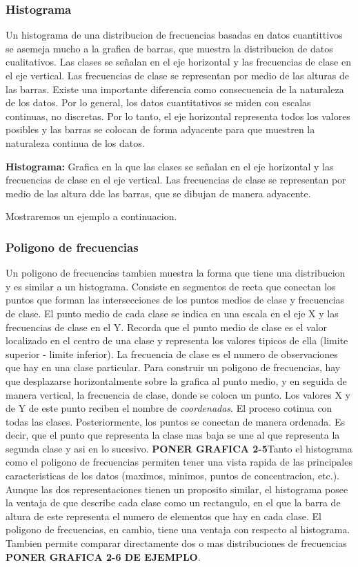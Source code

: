 \documentclass[]{article}
\begin{document}
\subsubsection*{Histograma}
Un histograma de una distribucion de frecuencias basadas en datos cuantittivos se asemeja mucho a la grafica de barras, que muestra la distribucion de datos cualitativos. Las clases se señalan en el eje horizontal y las frecuencias de clase en el eje vertical. Las frecuencias de clase se representan por medio de las alturas de las barras. Existe una importante diferencia como consecuencia de la naturaleza de los datos. Por lo general, los datos cuantitativos se miden con escalas continuas, no discretas. Por lo tanto, el eje horizontal representa todos los valores posibles y las barras se colocan de forma adyacente para que muestren la naturaleza continua de los datos.
\begin{center}
	\textbf{Histograma: }Grafica en la que las clases se señalan en el eje horizontal y las frecuencias de clase en el eje vertical. Las frecuencias de clase se representan por medio de las altura dde las barras, que se dibujan de manera adyacente.
\end{center}
Mostraremos un ejemplo a continuacion.
\subsubsection*{Poligono de frecuencias}
Un poligono de frecuencias tambien muestra la forma que tiene una distribucion y es similar a un histograma. Consiste en segmentos de recta que conectan los puntos que forman las intersecciones de los puntos medios de clase y frecuencias de clase. El punto medio de cada clase se indica en una escala en el eje X y las frecuencias de clase en el Y. Recorda que el punto medio de clase es el valor localizado en el centro de una clase y representa los valores tipicos de ella (limite superior - limite inferior). La frecuencia de clase es el numero de observaciones que hay en una clase particular. Para construir un poligono de frecuencias, hay que desplazarse horizontalmente sobre la grafica al punto medio, y en seguida de manera vertical, la frecuencia de clase, donde se coloca un punto. Los valores X y de Y de este punto reciben el nombre de \textit{coordenadas}. El proceso cotinua con todas las clases. Posteriormente, los puntos se conectan de manera ordenada. Es decir, que el punto que representa la clase mas baja se une al que representa la segunda clase y asi en lo sucesivo. \textbf{PONER GRAFICA 2-5}\linebreak Tanto el histograma como el poligono de frecuencias permiten tener una vista rapida de las principales caracteristicas de los datos (maximos, minimos, puntos de concentracion, etc.). Aunque las dos representaciones tienen un proposito similar, el histograma posee la ventaja de que describe cada clase como un rectangulo, en el que la barra de altura de este representa el numero de elementos que hay en cada clase. El poligono de frecuencias, en cambio, tiene una ventaja con respecto al histograma. Tambien permite comparar directamente dos o mas distribuciones de frecuencias \textbf{PONER GRAFICA 2-6 DE EJEMPLO}.
\end{document}

